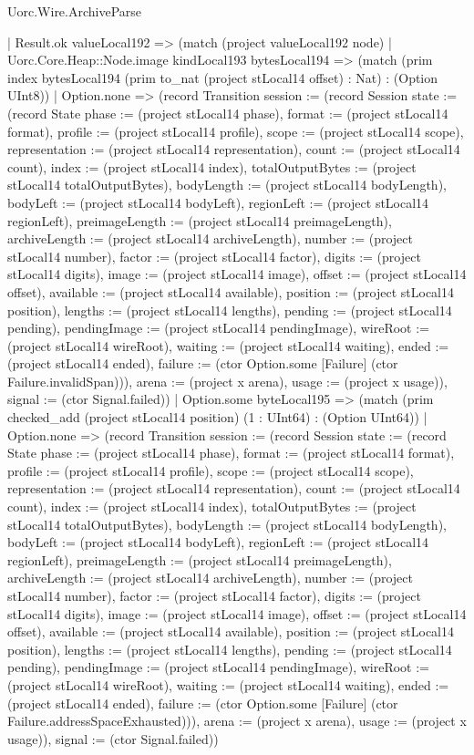\begin{lexlean}{Uorc.Wire.ArchiveParse}
\begin{semanticmodule}
{          | Result.ok valueLocal192 => (match (project valueLocal192 node)
            | Uorc.Core.Heap::Node.image kindLocal193 bytesLocal194 => (match (prim index bytesLocal194 (prim to_nat (project stLocal14 offset) : Nat) : (Option UInt8))
              | Option.none => (record Transition {session := (record Session {state := (record State {phase := (project stLocal14 phase), format := (project stLocal14 format), profile := (project stLocal14 profile), scope := (project stLocal14 scope), representation := (project stLocal14 representation), count := (project stLocal14 count), index := (project stLocal14 index), totalOutputBytes := (project stLocal14 totalOutputBytes), bodyLength := (project stLocal14 bodyLength), bodyLeft := (project stLocal14 bodyLeft), regionLeft := (project stLocal14 regionLeft), preimageLength := (project stLocal14 preimageLength), archiveLength := (project stLocal14 archiveLength), number := (project stLocal14 number), factor := (project stLocal14 factor), digits := (project stLocal14 digits), image := (project stLocal14 image), offset := (project stLocal14 offset), available := (project stLocal14 available), position := (project stLocal14 position), lengths := (project stLocal14 lengths), pending := (project stLocal14 pending), pendingImage := (project stLocal14 pendingImage), wireRoot := (project stLocal14 wireRoot), waiting := (project stLocal14 waiting), ended := (project stLocal14 ended), failure := (ctor Option.some [Failure] (ctor Failure.invalidSpan))}), arena := (project x arena), usage := (project x usage)}), signal := (ctor Signal.failed)})
              | Option.some byteLocal195 => (match (prim checked_add (project stLocal14 position) (1 : UInt64) : (Option UInt64))
                | Option.none => (record Transition {session := (record Session {state := (record State {phase := (project stLocal14 phase), format := (project stLocal14 format), profile := (project stLocal14 profile), scope := (project stLocal14 scope), representation := (project stLocal14 representation), count := (project stLocal14 count), index := (project stLocal14 index), totalOutputBytes := (project stLocal14 totalOutputBytes), bodyLength := (project stLocal14 bodyLength), bodyLeft := (project stLocal14 bodyLeft), regionLeft := (project stLocal14 regionLeft), preimageLength := (project stLocal14 preimageLength), archiveLength := (project stLocal14 archiveLength), number := (project stLocal14 number), factor := (project stLocal14 factor), digits := (project stLocal14 digits), image := (project stLocal14 image), offset := (project stLocal14 offset), available := (project stLocal14 available), position := (project stLocal14 position), lengths := (project stLocal14 lengths), pending := (project stLocal14 pending), pendingImage := (project stLocal14 pendingImage), wireRoot := (project stLocal14 wireRoot), waiting := (project stLocal14 waiting), ended := (project stLocal14 ended), failure := (ctor Option.some [Failure] (ctor Failure.addressSpaceExhausted))}), arena := (project x arena), usage := (project x usage)}), signal := (ctor Signal.failed)})
}
\end{semanticmodule}
\end{lexlean}
